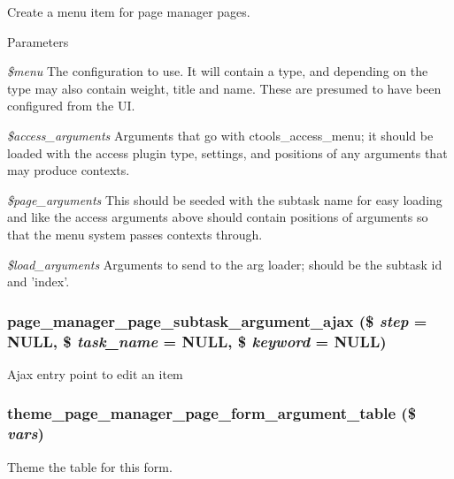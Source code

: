 \label{page_8admin_8inc_a649d45ee42b5d2c2541a994585495c38}
Create a menu item for page manager pages.


\begin{DoxyParams}{Parameters}
\item[{\em \$menu}]The configuration to use. It will contain a type, and depending on the type may also contain weight, title and name. These are presumed to have been configured from the UI. \item[{\em \$access\_\-arguments}]Arguments that go with ctools\_\-access\_\-menu; it should be loaded with the access plugin type, settings, and positions of any arguments that may produce contexts. \item[{\em \$page\_\-arguments}]This should be seeded with the subtask name for easy loading and like the access arguments above should contain positions of arguments so that the menu system passes contexts through. \item[{\em \$load\_\-arguments}]Arguments to send to the arg loader; should be the subtask id and 'index'. \end{DoxyParams}
\hypertarget{page_8admin_8inc_a7efab6e6f23dbf0808f9a3fcfb644464}{
\subsubsection[{page\_\-manager\_\-page\_\-subtask\_\-argument\_\-ajax}]{\setlength{\rightskip}{0pt plus 5cm}page\_\-manager\_\-page\_\-subtask\_\-argument\_\-ajax (\$ {\em step} = {\ttfamily NULL}, \/  \$ {\em task\_\-name} = {\ttfamily NULL}, \/  \$ {\em keyword} = {\ttfamily NULL})}}
\label{page_8admin_8inc_a7efab6e6f23dbf0808f9a3fcfb644464}
Ajax entry point to edit an item \hypertarget{page_8admin_8inc_a05df2ed3370fd03d5b411e1cf9fdbd69}{
\subsubsection[{theme\_\-page\_\-manager\_\-page\_\-form\_\-argument\_\-table}]{\setlength{\rightskip}{0pt plus 5cm}theme\_\-page\_\-manager\_\-page\_\-form\_\-argument\_\-table (\$ {\em vars})}}
\label{page_8admin_8inc_a05df2ed3370fd03d5b411e1cf9fdbd69}
Theme the table for this form. 